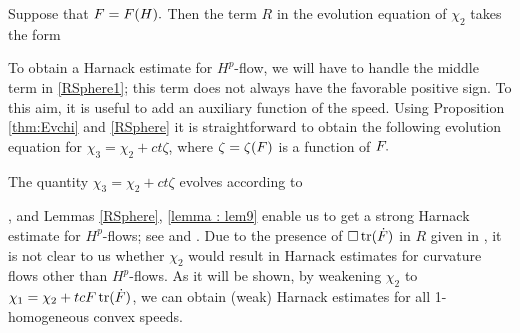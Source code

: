 \documentclass{amsart}
\begin{document}
\begin{lemma}\label{RSphere}
Suppose that $F=F(H).$ Then the term $R$ in the evolution equation of $\chi_2$ takes the form
\end{lemma}
To obtain a Harnack estimate for $H^{p}$-flow, we will have to handle the middle term in \eqref{RSphere1}; this term does not always have the favorable positive sign. To this aim, it is useful to add an auxiliary function of the speed. Using Proposition \ref{thm:Evchi} and \cref{RSphere} it is straightforward to obtain the following evolution equation for $\chi_3=\chi_2+ct\zeta$, where $\zeta=\zeta(F)$ is a function of $F.$
\begin{lemma}\label{lemma : lem9}
The quantity
$\chi_3=\chi_2+ct\zeta$
evolves according to
\end{lemma}
, and Lemmas \ref{RSphere}, \ref{lemma : lem9} enable us to get a strong Harnack estimate for $H^{p}$-flows; see  and . Due to the presence of $\Box\operatorname{tr}(\dot{F})$ in $R$ given in , it is not clear to us whether $\chi_2$ would result in Harnack estimates for curvature flows other than $H^{p}$-flows. As it will be shown, by weakening $\chi_2$ to $\chi_1=\chi_2+tcF\operatorname{tr}(\dot{F})$,  we can obtain (weak) Harnack estimates for all 1-homogeneous convex speeds.
\end{document}

